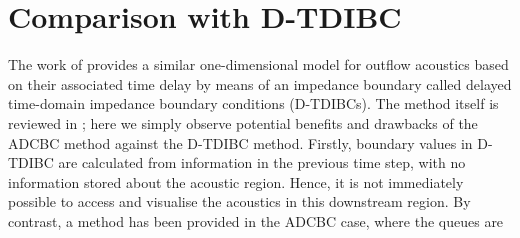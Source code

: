 \section{Comparison with D-TDIBC}

The work of \cite{douasbin2018DelayedtimeDomainImpedance} provides a similar one-dimensional model for outflow acoustics based on their associated time delay by means of an impedance boundary called delayed time-domain impedance boundary conditions (D-TDIBCs). The method itself is reviewed in ; here we simply observe potential benefits and drawbacks of the ADCBC method against the D-TDIBC method. Firstly, boundary values in D-TDIBC are calculated from information in the previous time step, with no information stored about the acoustic region. Hence, it is not immediately possible to access and visualise the acoustics in this downstream region. By contrast, a method has been provided in the ADCBC case, where the queues are 



